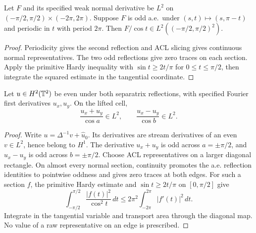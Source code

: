 \begin{lemma}
\label{lem:cosine-hardy-reflection}
\leanok
Let $F$ and its specified weak normal derivative be $L^2$ on
$(-\pi/2,\pi/2)\times(-2\pi,2\pi)$. Suppose $F$ is odd a.e.\ under
$(s,t)\mapsto(s,\pi-t)$ and periodic in $t$ with period $2\pi$.
Then $F/\cos t\in L^2((-\pi/2,\pi/2)^2)$.
\end{lemma}

\begin{proof}
\leanok
Periodicity gives the second reflection and ACL slicing gives continuous
normal representatives. The two odd reflections give zero traces on each
section. Apply the primitive Hardy inequality with
$\sin t\ge 2t/\pi$ for $0\le t\le\pi/2$, then integrate the squared estimate
in the tangential coordinate.
\end{proof}

\begin{lemma}
\label{lem:even-h2-diagonal-hardy}
\leanok
Let $u\in H^2(\mathbb{T}^2)$ be even under both separatrix reflections, with specified
Fourier first derivatives $u_x,u_y$. On the lifted cell,
\[
 \frac{u_x+u_y}{\cos a}\in L^2,\qquad
 \frac{u_x-u_y}{\cos b}\in L^2.
\]
\end{lemma}

\begin{proof}
\leanok
Write $u=\Delta^{-1}v+\widehat u_0$. Its derivatives are stream derivatives
of an even $v\in L^2$, hence belong to $H^1$. The derivative $u_x+u_y$ is
odd across $a=\pm\pi/2$, and $u_x-u_y$ is odd across $b=\pm\pi/2$.
Choose ACL representatives on a larger diagonal rectangle. On almost every
normal section, continuity promotes the a.e. reflection identities to
pointwise oddness and gives zero traces at both edges.
For such a section $f$, the primitive Hardy estimate and
$\sin t\ge2t/\pi$ on $[0,\pi/2]$ give
\[
 \int_{-\pi/2}^{\pi/2}\frac{|f(t)|^2}{\cos^2t}\,dt
 \le2\pi^2\int_{-2\pi}^{2\pi}|f'(t)|^2\,dt.
\]
Integrate in the tangential variable and transport area through the diagonal
map. No value of a raw representative on an edge is prescribed.
\end{proof}

